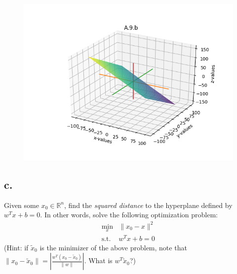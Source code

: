 \documentclass{article}
\newcommand{\field}[1]{\mathbb{#1}}
\newcommand{\1}{\mathbf{1}}
\newcommand{\R}{\field{R}} %
\begin{document}
{\begin{figure}[ht!]
  \centering
  \includegraphics[width=180mm]{A9b.PNG}
\end{figure}

\subsection*{c.}
Given some $x_0 \in \R^n$, find the \emph{squared distance} to the hyperplane defined by $w^T x + b=0$.
	In other words, solve the following optimization problem:
	\begin{align*}
	\min_x& \|x_0 - x \|^2\\
	\text{s.t. }&w^Tx +b = 0
	\end{align*}
	(Hint: if $\widetilde{x}_0$ is the minimizer of the above problem, note that $\| x_0 - \widetilde{x}_0 \| = | \frac{w^T(x_0 - \widetilde{x}_0)}{\|w\|} |$. What is $w^T \widetilde{x}_0$?)

}
\end{document}
